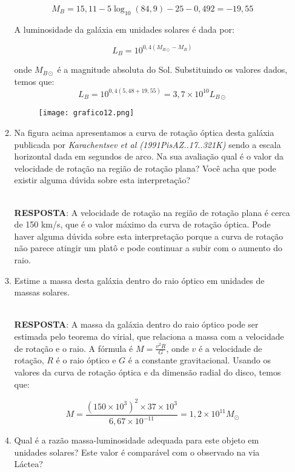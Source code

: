 \documentclass[a4paper,12pt]{article}
\begin{document}
\begin{enumerate}
\begin{enumerate}
$$M_B = 15,11 - 5 \log_{10} (84,9) - 25 - 0,492 = -19,55$$

A luminosidade da galáxia em unidades solares é dada por:

$$L_B = 10^{0,4(M_{B\odot} - M_B)}$$

onde $M_{B\odot}$ é a magnitude absoluta do Sol. Substituindo os valores dados, temos que: $$L_B = 10^{0,4(5,48 + 19,55)} = 3,7 \times 10^{10} L_{B\odot}$$

\noindent\hrulefill

\begin{figure}[H]
\centering
\texttt{[image: grafico12.png]}
\end{figure}

\item Na figura acima apresentamos a curva de rotação óptica desta galáxia publicada por \textit{Karachentsev et al (1991PisAZ..17..321K)} sendo a escala horizontal dada em segundos de arco. Na sua avaliação qual é o valor da velocidade de rotação na região de rotação plana? Você acha que pode existir alguma dúvida sobre esta interpretação?

\noindent\hrulefill\\\textbf{RESPOSTA}: A velocidade de rotação na região de rotação plana é cerca de 150 km/s, que é o valor máximo da curva de rotação óptica. Pode haver alguma dúvida sobre esta interpretação porque a curva de rotação não parece atingir um platô e pode continuar a subir com o aumento do raio.

\noindent\hrulefill

\item Estime a massa desta galáxia dentro do raio óptico em unidades de massas solares.

\noindent\hrulefill\\\textbf{RESPOSTA}: A massa da galáxia dentro do raio óptico pode ser estimada pelo teorema do virial, que relaciona a massa com a velocidade de rotação e o raio. A fórmula é $M = \frac{v^2 R}{G}$, onde $v$ é a velocidade de rotação, $R$ é o raio óptico e $G$ é a constante gravitacional. Usando os valores da curva de rotação óptica e da dimensão radial do disco, temos que:

$$M = \frac{(150 \times 10^3)^2 \times 37 \times 10^3}{6,67 \times 10^{-11}} = 1,2 \times 10^{11} M_{\odot}$$

\noindent\hrulefill

\item Qual é a razão massa-luminosidade adequada para este objeto em unidades solares? Este valor é comparável com o observado na via Láctea?


\end{enumerate}
\end{enumerate}
\end{document}
